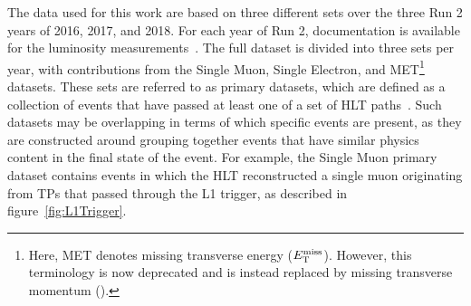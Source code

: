 The data used for this work are based on three different sets over the three Run 2 years of 2016, 2017, and 2018.
For each year of Run 2, documentation is available for the luminosity measurements~\cite{CMS-PAS-LUM-17-001,CMS-PAS-LUM-17-004,CMS-PAS-LUM-18-002}.
The full dataset is divided into three sets per year, with contributions from the Single Muon, Single Electron, and MET\footnote{Here, MET denotes missing transverse energy ($E_\mathrm{T}^\mathrm{miss}$).
However, this terminology is now deprecated and is instead replaced by missing transverse momentum (\ptmiss).} datasets.
These sets are referred to as primary datasets, which are defined as a collection of events that have passed at least one of a set of HLT paths~\cite{Franzoni2016}.
Such datasets may be overlapping in terms of which specific events are present, as they are constructed around grouping together events that have similar physics content in the final state of the event.
For example, the Single Muon primary dataset contains events in which the HLT reconstructed a single muon originating from TPs that passed through the L1 trigger, as described in figure~\ref{fig:L1Trigger}.

